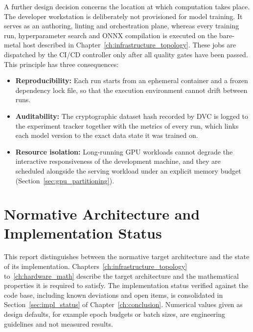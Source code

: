 A further design decision concerns the location at which computation takes place. The developer workstation is deliberately not provisioned for model training. It serves as an authoring, linting and orchestration plane, whereas every training run, hyperparameter search and ONNX compilation is executed on the bare-metal host described in Chapter~\ref{ch:infrastructure_topology}. These jobs are dispatched by the CI/CD controller only after all quality gates have been passed. This principle has three consequences:
\begin{itemize}
    \item \textbf{Reproducibility:} Each run starts from an ephemeral container and a frozen dependency lock file, so that the execution environment cannot drift between runs.
    \item \textbf{Auditability:} The cryptographic dataset hash recorded by DVC is logged to the experiment tracker together with the metrics of every run, which links each model version to the exact data state it was trained on.
    \item \textbf{Resource isolation:} Long-running GPU workloads cannot degrade the interactive responsiveness of the development machine, and they are scheduled alongside the serving workload under an explicit memory budget (Section~\ref{sec:gpu_partitioning}).
\end{itemize}

\section{Normative Architecture and Implementation Status}
\label{sec:normative_status}

This report distinguishes between the normative target architecture and the state of its implementation. Chapters~\ref{ch:infrastructure_topology} to~\ref{ch:hardware_math} describe the target architecture and the mathematical properties it is required to satisfy. The implementation status verified against the code base, including known deviations and open items, is consolidated in Section~\ref{sec:impl_status} of Chapter~\ref{ch:conclusion}. Numerical values given as design defaults, for example epoch budgets or batch sizes, are engineering guidelines and not measured results.
